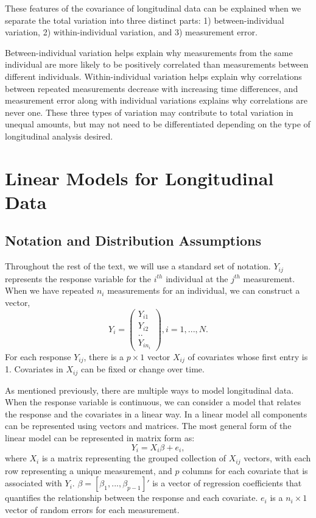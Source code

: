 \documentclass[12pt, twoside]{amherstthesis}
\begin{document}
These features of the covariance of longitudinal data can be explained when we separate the total variation into three distinct parts: 1) between-individual variation, 2) within-individual variation, and 3) measurement error.

Between-individual variation helps explain why measurements from the same individual are more likely to be positively correlated than measurements between different individuals. Within-individual variation helps explain why correlations between repeated measurements decrease with increasing time differences, and measurement error along with individual variations explains why correlations are never one. These three types of variation may contribute to total variation in unequal amounts, but may not need to be differentiated depending on the type of longitudinal analysis desired.

\hypertarget{linear-models-for-longitudinal-data}{%
\section{Linear Models for Longitudinal Data}\label{linear-models-for-longitudinal-data}}

\hypertarget{notation-and-distribution-assumptions}{%
\subsection{Notation and Distribution Assumptions}\label{notation-and-distribution-assumptions}}

Throughout the rest of the text, we will use a standard set of notation. \(Y_{ij}\) represents the response variable for the \(i^{th}\) individual at the \(j^{th}\) measurement. When we have repeated \(n_i\) measurements for an individual, we can construct a vector, \[Y_i = \begin{pmatrix} Y_{i1}\\ Y_{i2} \\ .. \\  Y_{in_i}  \end{pmatrix}, i=1,...,N.\] For each response \(Y_{ij}\), there is a \(p \times 1\) vector \(X_{ij}\) of covariates whose first entry is 1. Covariates in \(X_{ij}\) can be fixed or change over time.

As mentioned previously, there are multiple ways to model longitudinal data. When the response variable is continuous, we can consider a model that relates the response and the covariates in a linear way. In a linear model all components can be represented using vectors and matrices. The most general form of the linear model can be represented in matrix form as:
\[Y_i=X_i\beta + e_i,\] where \(X_i\) is a matrix representing the grouped collection of \(X_{ij}\) vectors, with each row representing a unique measurement, and \(p\) columns for each covariate that is associated with \(Y_i.\) \(\beta = [\beta_1,...,\beta_{p-1}]'\) is a vector of regression coefficients that quantifies the relationship between the response and each covariate. \(e_i\) is a \(n_i \times 1\) vector of random errors for each measurement.
\end{document}
